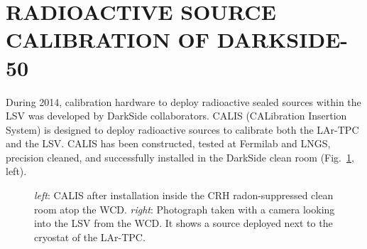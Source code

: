 \section{RADIOACTIVE SOURCE CALIBRATION OF DARKSIDE-50}
\label{sec:calibration}

During 2014, calibration hardware to deploy radioactive sealed sources within the LSV was developed by DarkSide collaborators. CALIS (CALibration Insertion System) is designed to deploy radioactive sources to calibrate both the LAr-TPC and the LSV. CALIS has been constructed, tested at Fermilab and LNGS, precision cleaned, and successfully installed in the DarkSide clean room (Fig.~\ref{fig:CALIS}, left). 

\begin{figure}[htbp]
\centering
{}
\caption{\textit{left}: CALIS after installation inside the CRH radon-suppressed clean room atop the WCD. \textit{right}: Photograph taken with a camera looking into the LSV from the WCD. It  shows a source deployed next to the cryostat of the LAr-TPC.
\label{fig:CALIS}}
\end{figure}

